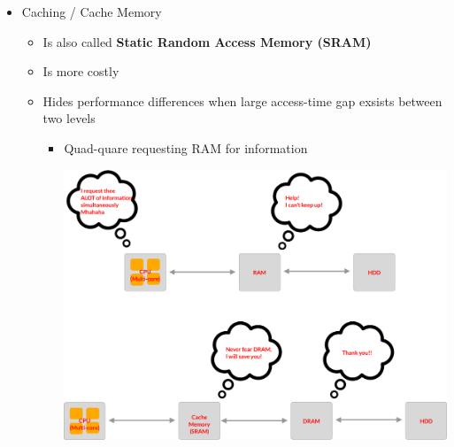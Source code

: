 \documentclass[12pt]{article}
\begin{document}
\begin{itemize}
    \item Caching / Cache Memory

    \begin{itemize}
        \item Is also called \textbf{Static Random Access Memory (SRAM)}
        \item Is more costly
        \item Hides performance differences when large access-time gap exsists
        between two levels
        \begin{itemize}
            \item Quad-quare requesting RAM for information

            \begin{center}
            \includegraphics[width=\linewidth]{../images/week_1_notes_1_4.png}
            \end{center}


\end{itemize}
\end{itemize}
\end{itemize}
\end{document}
